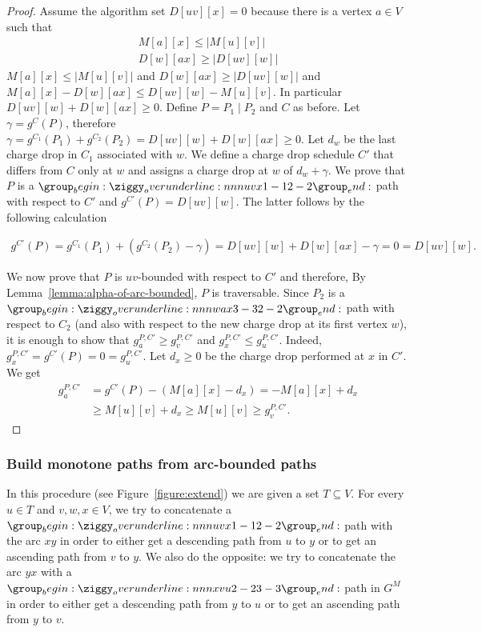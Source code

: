 \documentclass[11pt]{article}
\begin{document}
\begin{proof}
    Assume the algorithm set $D[uv][x] = 0$ because there is a vertex $a\in V$ such that
    \begin{align}
        M[a][x]\le  |M[u][v]| \\
        D[w][ax]\ge  |D[uv][w]|
    \end{align}
    $M[a][x]\le  |M[u][v]|$ and 
    $D[w][ax]\ge  |D[uv][w]|$ and $M[a][x]-D[w][ax]\le D[uv][w]-M[u][v]$. In particular $D[uv][w] + D[w][ax]\ge 0 $.  Define $P = P_1\mid P_2$ and $C$ as before. Let $\gamma = g^C(P)$, therefore $\gamma =  g^{C_1}(P_1) + g^{C_2}(P_2) = D[uv][w]+D[w][ax] \ge 0$.  Let $d_w$ be the last charge drop in $C_1$ associated with $w$. We define a charge drop schedule $C'$ that differs from $C$ only at $w$ and assigns a charge drop at $w$ of $d_w+\gamma$. We prove that $P$ is a $\overunderline{uvx}{1-1}{2-2}$ path with respect to $C'$ and $g^{C'}(P)=D[uv][w]$. The latter follows by the following calculation

    \begin{align*}
        g^{C'}(P)
        = g^{C_1}(P_1) + (g^{C_2}(P_2)-\gamma)
        = D[uv][w] + D[w][ax] - \gamma
        = 0
        =D[uv][w].
    \end{align*}
    
    We now prove that $P$ is $uv$-bounded with respect to $C'$ and therefore, By Lemma~\ref{lemma:alpha-of-arc-bounded}, $P$ is traversable. Since $P_2$ is a $\overunderline{wax}{3-3}{2-2}$ path with respect to $C_2$ (and also with respect to the new charge drop at its first vertex $w$), it is enough to show that  $g^{P,C'}_a \ge g^{P,C'}_v$ and $g^{P,C'}_x\le g^{P,C'}_u$. Indeed, $g^{P,C'}_x = g^{C'}(P)= 0 = g^{P,C'}_u$. Let $d_x\ge 0$ be the charge drop performed at $x$ in $C'$. We get
    \begin{align*}
        g^{P,C'}_a 
        &= g^{C'}(P)-(M[a][x]-d_x)
        = - M[a][x] +d_x \\
        &\ge M[u][v] +d_x
        \ge M[u][v] 
        \ge g^{P,C'}_v.
    \end{align*}     
\end{proof}


\subsubsection{Build monotone paths from arc-bounded paths}\label{sec:extend}
In this procedure (see Figure~\ref{figure:extend}) we are given a set $T\subseteq V$. For every $u\in T$ and $v,w,x\in V$, we try to concatenate a $\overunderline{uvx}{1-1}{2-2}$ path with the arc $xy$ in order to either get a descending path from $u$ to $y$ or to get an ascending path from $v$ to $y$. 
We also do the opposite:
we try to concatenate the arc $yx$ with a $\overunderline{xvu}{2-2}{3-3}$ path in $G^M$ in order to either get a descending path from $y$ to $u$ or to get an ascending path from $y$ to $v$.
\end{document}
